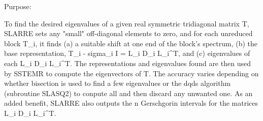  \begin{DoxyParagraph}{Purpose\+: }
\begin{DoxyVerb} To find the desired eigenvalues of a given real symmetric
 tridiagonal matrix T, SLARRE sets any "small" off-diagonal
 elements to zero, and for each unreduced block T_i, it finds
 (a) a suitable shift at one end of the block's spectrum,
 (b) the base representation, T_i - sigma_i I = L_i D_i L_i^T, and
 (c) eigenvalues of each L_i D_i L_i^T.
 The representations and eigenvalues found are then used by
 SSTEMR to compute the eigenvectors of T.
 The accuracy varies depending on whether bisection is used to
 find a few eigenvalues or the dqds algorithm (subroutine SLASQ2) to
 conpute all and then discard any unwanted one.
 As an added benefit, SLARRE also outputs the n
 Gerschgorin intervals for the matrices L_i D_i L_i^T.\end{DoxyVerb}
 
\end{DoxyParagraph}

